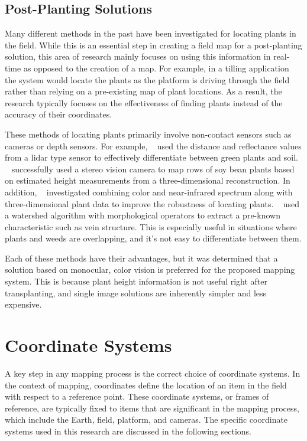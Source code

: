 \subsection{Post-Planting Solutions}

Many different methods in the past have been investigated for locating plants in the field.  While this is an essential step in creating a field map for a post-planting solution, this area of research mainly focuses on using this information in real-time as opposed to the creation of a map.  For example, in a tilling application the system would locate the plants as the platform is driving through the field rather than relying on a pre-existing map of plant locations.  As a result, the research typically focuses on the effectiveness of finding plants instead of the accuracy of their coordinates.  

These methods of locating plants primarily involve non-contact sensors such as cameras or depth sensors.  For example, ~\citep{Andujar:2013} used the distance and reflectance values from a \ac{lidar} type sensor to effectively differentiate between green plants and soil. ~\citep{Kise:2005} successfully used a stereo vision camera to map rows of soy bean plants based on estimated height measurements from a three-dimensional reconstruction.  In addition, ~\citep{Panneton:2014} investigated combining color and near-infrared spectrum along with three-dimensional plant data to improve the robustness of locating plants.  ~\citep{Soille:2000} used a watershed algorithm with morphological operators to extract a pre-known characteristic such as vein structure.  This is especially useful in situations where plants and weeds are overlapping, and it's not easy to differentiate between them.

Each of these methods have their advantages, but it was determined that a solution based on monocular, color vision is preferred for the proposed mapping system.  This is because plant height information is not useful right after transplanting, and single image solutions are inherently simpler and less expensive. 

\section{Coordinate Systems}

A key step in any mapping process is the correct choice of coordinate systems.  In the context of mapping, coordinates define the location of an item in the field with respect to a reference point.  These coordinate systems, or frames of reference, are typically fixed to items that are significant in the mapping process, which include the Earth, field, platform, and cameras.  The specific coordinate systems used in this research are discussed in the following sections.

